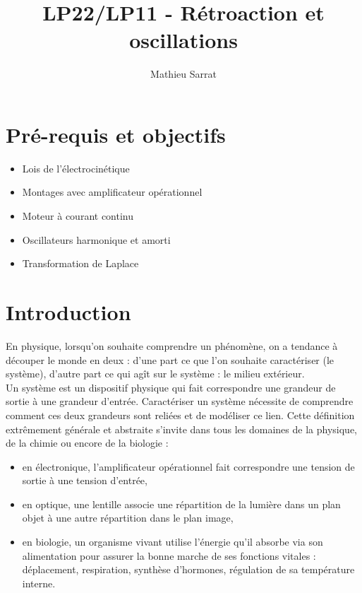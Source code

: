 \documentclass[11pt,a4paper]{report}
\author{Mathieu Sarrat}
\title{LP22/LP11 - Rétroaction et oscillations}
\begin{document}
\maketitle

\section*{Pré-requis et objectifs}

\begin{itemize}
	\item Lois de l'électrocinétique
	\item Montages avec amplificateur opérationnel
	\item Moteur à courant continu
	\item Oscillateurs harmonique et amorti
	\item Transformation de Laplace
\end{itemize}

\newpage
\section*{Introduction}

En physique, lorsqu'on souhaite comprendre un phénomène, on a tendance à découper le monde en deux : d'une part ce que l'on souhaite caractériser (le système), d'autre part ce qui agît sur le système : le milieu extérieur.\\

Un système est un dispositif physique qui fait correspondre une grandeur de sortie à une grandeur d'entrée. Caractériser un système nécessite de comprendre comment ces deux grandeurs sont reliées et de modéliser ce lien. Cette définition extrêmement générale et abstraite s'invite dans tous les domaines de la physique, de la chimie ou encore de la biologie :
\begin{itemize}
	\item en électronique, l'amplificateur opérationnel fait correspondre une tension de sortie à une tension d'entrée,
	\item en optique, une lentille associe une répartition de la lumière dans un plan objet à une autre répartition dans le plan image,
	\item en biologie, un organisme vivant utilise l'énergie qu'il absorbe via son alimentation pour assurer la bonne marche de ses fonctions vitales : déplacement, respiration, synthèse d'hormones, régulation de sa température interne.\\
\end{itemize}
\end{document}
